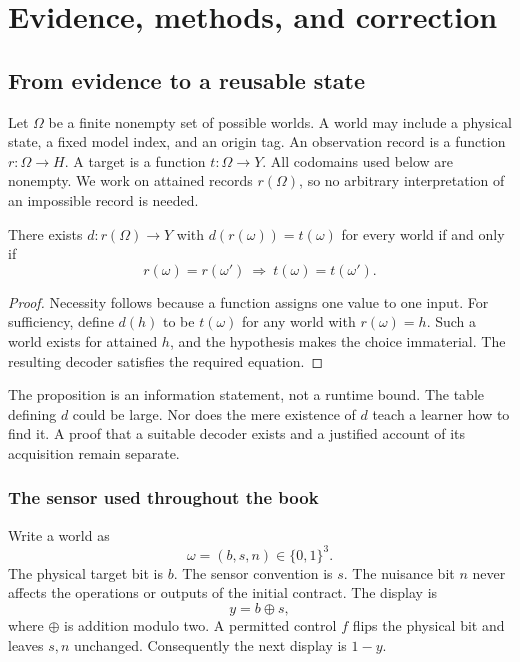 \part{Evidence, methods, and correction}
\chapter{From evidence to a reusable state}\label{Core:book:chapter-1}
\setcounter{section}{0}\label{Core:ch:evidence}
Let $\Omega$ be a finite nonempty set of possible worlds. A world may include a physical state, a fixed model index, and an origin tag. An observation record is a function $r:\Omega\to H$. A target is a function $t:\Omega\to Y$. All codomains used below are nonempty. We work on attained records $r(\Omega)$, so no arbitrary interpretation of an impossible record is needed.

\begin{Coreproposition}\label{Core:r:factor}
There exists $d:r(\Omega)\to Y$ with $d(r(\omega))=t(\omega)$ for every world if and only if
\[
r(\omega)=r(\omega')\ \Longrightarrow\ t(\omega)=t(\omega').
\]
\end{Coreproposition}
\begin{proof}
Necessity follows because a function assigns one value to one input. For sufficiency, define $d(h)$ to be $t(\omega)$ for any world with $r(\omega)=h$. Such a world exists for attained $h$, and the hypothesis makes the choice immaterial. The resulting decoder satisfies the required equation.
\end{proof}

The proposition is an information statement, not a runtime bound. The table defining $d$ could be large. Nor does the mere existence of $d$ teach a learner how to find it. A proof that a suitable decoder exists and a justified account of its acquisition remain separate.

\section{The sensor used throughout the book}
Write a world as
\[
\omega=(b,s,n)\in\{0,1\}^3.
\]
The physical target bit is $b$. The sensor convention is $s$. The nuisance bit $n$ never affects the operations or outputs of the initial contract. The display is
\[
y=b\oplus s,
\]
where $\oplus$ is addition modulo two. A permitted control $f$ flips the physical bit and leaves $s,n$ unchanged. Consequently the next display is $1-y$.

